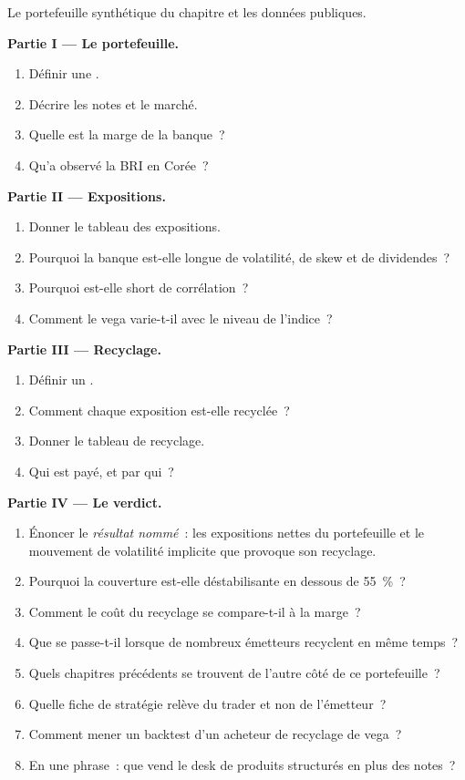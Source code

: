 \begin{problem}\label{pb:s2:hedging-a-structured-products-book:1}
Le portefeuille synthétique du chapitre et les données publiques.

\medskip\noindent\textbf{Partie I --- Le portefeuille.}
\begin{enumerate}
\item Définir une .
\item Décrire les notes et le marché.
\item Quelle est la marge de la banque~?
\item Qu'a observé la BRI en Corée~?
\end{enumerate}

\medskip\noindent\textbf{Partie II --- Expositions.}
\begin{enumerate}[resume]
\item Donner le tableau des expositions.
\item Pourquoi la banque est-elle longue de volatilité, de skew et de dividendes~?
\item Pourquoi est-elle short de corrélation~?
\item Comment le vega varie-t-il avec le niveau de l'indice~?
\end{enumerate}

\medskip\noindent\textbf{Partie III --- Recyclage.}
\begin{enumerate}[resume]
\item Définir un .
\item Comment chaque exposition est-elle recyclée~?
\item Donner le tableau de recyclage.
\item Qui est payé, et par qui~?
\end{enumerate}

\medskip\noindent\textbf{Partie IV --- Le verdict.}
\begin{enumerate}[resume]
\item Énoncer le \emph{résultat nommé}~: les expositions nettes du portefeuille et le mouvement de volatilité implicite que provoque son recyclage.
\item Pourquoi la couverture est-elle déstabilisante en dessous de 55~\%~?
\item Comment le coût du recyclage se compare-t-il à la marge~?
\item Que se passe-t-il lorsque de nombreux émetteurs recyclent en même temps~?
\item Quels chapitres précédents se trouvent de l'autre côté de ce portefeuille~?
\item Quelle fiche de stratégie relève du trader et non de l'émetteur~?
\item Comment mener un backtest d'un acheteur de recyclage de vega~?
\item En une phrase~: que vend le desk de produits structurés en plus des notes~?
\end{enumerate}
\end{problem}

